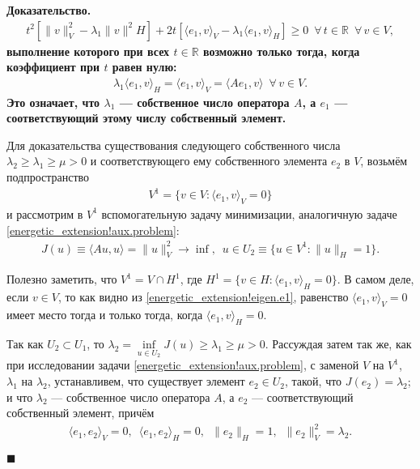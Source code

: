 \documentclass{report}
\newcounter{lem}[section]
\newenvironment{Proof}{\par\noindent\bf Доказательство.\rm}{ $\blacksquare$\par}
\begin{document}
\begin{Proof}
\begin{gather*}
t^2[\|v\|^2_V-\lambda_1\|v\|^2H]+2t[\langle e_1,v\rangle_V-\lambda_1\langle e_1,v\rangle_H]\geqslant0\,\,\,\forall\,t\in\mathbb{R}\,\,\,\forall\,v\in V,
\end{gather*}
выполнение которого при всех $t\in\mathbb{R}$ возможно только тогда, когда коэффициент при $t$ равен нулю:
\begin{gather}\label{energetic_extension!eigen.e1}
\lambda_1\langle e_1,v\rangle_H=\langle e_1,v\rangle_V=\langle Ae_1,v\rangle\,\,\,\forall\,v\in V.
\end{gather}
Это означает, что $\lambda_1$ --- собственное число оператора $A$, а $e_1$ --- соответствующий этому числу собственный элемент.

Для доказательства существования следующего собственного числа $\lambda_2\geqslant\lambda_1\geqslant\mu>0$ и соответствующего ему собственного элемента $e_2$ в $V$, возьмём подпространство
\begin{gather*}
V^1=\{v\in V:\langle e_1,v\rangle_V=0\}
\end{gather*}
и рассмотрим в $V^1$ вспомогательную задачу минимизации, аналогичную задаче \eqref{energetic_extension!aux.problem}:
\begin{gather}\label{energetic_extension!aux.problem.V1}
J(u)\equiv\langle Au,u\rangle=\|u\|_V^2\to\inf,\,\,\,u\in U_2\equiv\{u\in V^1:\|u\|_H=1\}.
\end{gather}

Полезно заметить, что $V^1=V\cap H^1$, где $H^1=\{v\in H:\langle e_1,v\rangle_H=0\}$. В самом деле, если $v\in V$, то как видно из \eqref{energetic_extension!eigen.e1}, равенство
$\langle e_1,v\rangle_V=0$ имеет место тогда и только тогда, когда $\langle e_1,v\rangle_H=0$.

Так как $U_2\subset U_1$, то $\lambda_2=\inf\limits_{u\in U_2}J(u)\geqslant\lambda_1\geqslant\mu>0$. Рассуждая затем так же, как при исследовании задачи
\eqref{energetic_extension!aux.problem}, с заменой $V$ на $V^1$, $\lambda_1$ на $\lambda_2$, устанавливем, что существует элемент $e_2\in U_2$, такой, что $J(e_2)=\lambda_2$; и что
$\lambda_2$ --- собственное число оператора $A$, а $e_2$ --- соответствующий собственный элемент, причём
\begin{gather*}
\langle e_1,e_2\rangle_V=0,\,\,\,\langle e_1,e_2\rangle_H=0,\,\,\,\|e_2\|_H=1,\,\,\,\|e_2\|_V^2=\lambda_2.
\end{gather*}


\end{Proof}
\end{document}
